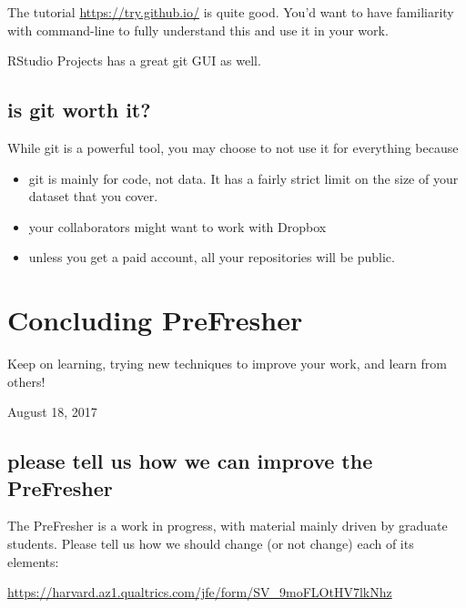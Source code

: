 \documentclass[]{book}
\providecommand{\tightlist}{%
  \setlength{\itemsep}{0pt}\setlength{\parskip}{0pt}}
\theoremstyle{definition}
\theoremstyle{definition}
\theoremstyle{definition}
\theoremstyle{remark}
\begin{document}
The tutorial \url{https://try.github.io/} is quite good. You'd want to
have familiarity with command-line to fully understand this and use it
in your work.

RStudio Projects has a great git GUI as well.

\subsection{is git worth it?}\label{is-git-worth-it}

While git is a powerful tool, you may choose to not use it for
everything because

\begin{itemize}
\tightlist
\item
  git is mainly for code, not data. It has a fairly strict limit on the
  size of your dataset that you cover.
\item
  your collaborators might want to work with Dropbox
\item
  unless you get a paid account, all your repositories will be public.
\end{itemize}

\section{Concluding PreFresher}\label{concluding-prefresher}

Keep on learning, trying new techniques to improve your work, and learn
from others!

August 18, 2017

\subsection{please tell us how we can improve the
PreFresher}\label{please-tell-us-how-we-can-improve-the-prefresher}

The PreFresher is a work in progress, with material mainly driven by
graduate students. Please tell us how we should change (or not change)
each of its elements:

\url{https://harvard.az1.qualtrics.com/jfe/form/SV_9moFLOtHV7lkNhz}


\end{document}
